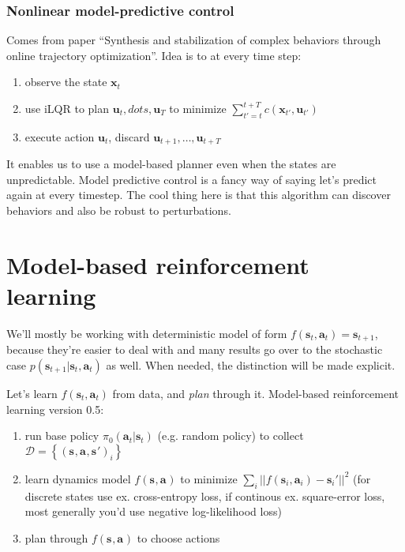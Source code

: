 \documentclass{report}
\begin{document}
\subsubsection{Nonlinear model-predictive control}
Comes from paper ``Synthesis and stabilization of complex behaviors through online trajectory optimization''.
Idea is to at every time step:
\begin{enumerate}
		\item observe the state $ \bm{x}_{t}  $
		\item use iLQR to plan $ \bm{u}_{t}, dots, \bm{u}_{T}  $ to minimize $ \sum_{t'=t}^{t+T} c (\bm{x}_{t'}, \bm{u}_{t'} )  $
		\item execute action $ \bm{u}_{t}  $, discard $ \bm{u}_{t+1}, \dots, \bm{u}_{t+T}  $
\end{enumerate}
It enables us to use a model-based planner even when the states are unpredictable.
Model predictive control is a fancy way of saying let's predict again at every timestep.
The cool thing here is that this algorithm can discover behaviors and also
be robust to perturbations.



















\section{Model-based reinforcement learning}
We'll mostly be working with deterministic model of form $f (\bm{s}_{t}, \bm{a}_{t} ) = \bm{s}_{t+1} $,
because they're easier to deal with and many results go over to the stochastic case 
$p(\bm{s}_{t+1} | \bm{s}_t, \bm{a}_t)$
as well. When needed, the distinction will be made explicit.

Let's learn $ f (\bm{s}_{t}, \bm{a}_{t} )$ from data, and \textit{plan} through it.
Model-based reinforcement learning version 0.5:
\begin{enumerate}
		\item run base policy $ \pi_0 (\bm{a}_t| \bm{s}_t)  $ (e.g. random policy) to collect $ \mathcal{D} = \left\{ \left( \bm{s}_{}, \bm{a}_{}, \bm{s}_{}' \right)_i  \right\}  $ 
		\item learn dynamics model $f(\bm{s}_{}, \bm{a}_{})$ to minimize $ \sum_{i}^{} || f (\bm{s}_{i}, \bm{a}_{i} ) - \bm{s}_{i}'||^2$ 
				(for discrete states use ex. cross-entropy loss, if continous ex. square-error loss, most generally you'd use negative log-likelihood loss)
		\item plan through $f(\bm{s}_{}, \bm{a}_{})$ to choose actions
\end{enumerate}
\end{document}
